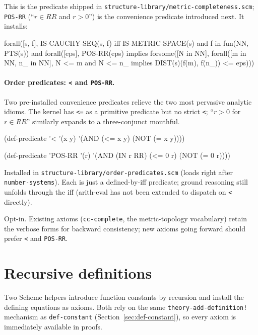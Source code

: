 \noindent
This is the predicate shipped in
\texttt{structure-library/metric-completeness.scm}; \texttt{POS-RR}
(``$r \in \mathit{RR}$ and $r > 0$'') is the convenience predicate introduced
next.  It installs:
\begin{VNBsnip}
forall([s, f],
  IS-CAUCHY-SEQ(s, f) iff
    IS-METRIC-SPACE(s)
    and f in fun(NN, PTS(s))
    and forall([eps], POS-RR(eps) implies
          forsome([N in NN],
            forall([m in NN, n_ in NN], N <= m and N <= n_ implies
              DIST(s)(f(m), f(n_)) <= eps)))
\end{VNBsnip}

\paragraph{Order predicates: \texttt{<} and \texttt{POS-RR}.}  Two
pre-installed convenience predicates relieve the two most pervasive
analytic idioms.  The kernel has \texttt{<=} as a primitive predicate
but no strict \texttt{<}; ``$r > 0$ for $r \in RR$'' similarly
expands to a three-conjunct mouthful.

\begin{VNBcode}
(def-predicate '< '(x y)
  '(AND (<= x y) (NOT (= x y))))

(def-predicate 'POS-RR '(r)
  '(AND (IN r RR) (<= 0 r) (NOT (= 0 r))))
\end{VNBcode}

Installed in \texttt{structure-library/order-predicates.scm} (loads
right after \texttt{number-systems}).  Each is just a defined-by-iff
predicate; ground reasoning still unfolds through the iff (arith-eval
has not been extended to dispatch on \texttt{<} directly).

\begin{remark}
Opt-in.  Existing axioms (\texttt{cc-complete}, the metric-topology
vocabulary) retain the verbose forms for backward consistency; new
axioms going forward should prefer \texttt{<} and \texttt{POS-RR}.
\end{remark}

\section{Recursive definitions}
\label{sec:recursive-defs}

Two Scheme helpers introduce function constants by recursion and install
the defining equations as axioms.  Both rely on the same
\texttt{theory-add-definition!} mechanism as \texttt{def-constant}
(Section~\ref{sec:def-constant}), so every axiom is immediately
available in proofs.

